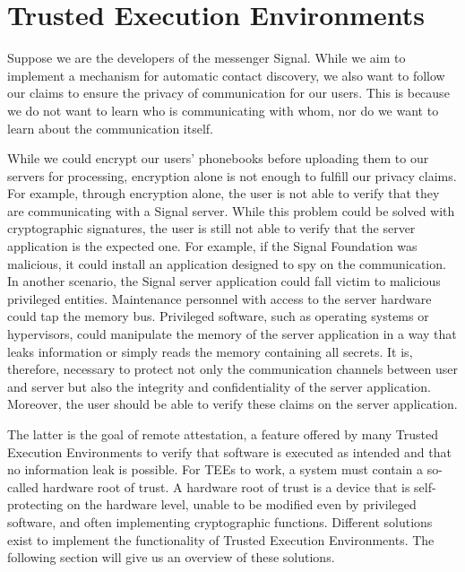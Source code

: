 \section{Trusted Execution Environments}
\label{sec:state:tee}

Suppose we are the developers of the messenger Signal. While we aim to implement a mechanism for automatic contact
discovery, we also want to follow our claims to ensure the privacy of communication for our users. This is because we do not
want to learn who is communicating with whom, nor do we want to learn about the communication itself.

While we could encrypt our users' phonebooks before uploading them to our servers for processing, encryption
alone is not enough to fulfill our privacy claims. For example, through encryption alone, the user is not able to
verify that they are communicating with a Signal server. While this problem could be solved with cryptographic
signatures, the user is still not able to verify that the server application is the expected one. For example, if
the Signal Foundation was malicious, it could install an application designed to spy on the communication. In another
scenario, the Signal server application could fall victim to malicious privileged entities.
Maintenance personnel with access to the server hardware could tap the memory bus. Privileged software, such as operating
systems or hypervisors, could manipulate the memory of the server application in a way that leaks information or
simply reads the memory containing all secrets. It is, therefore, necessary to protect not only the communication channels
between user and server but also the integrity and confidentiality of the server application. Moreover, the user should
be able to verify these claims on the server application.

The latter is the goal of remote attestation, a feature offered by many Trusted Execution Environments to verify that
software is executed as intended and that no information leak is possible. For TEEs to work, a system must contain a
so-called hardware root of trust. A hardware root of trust is a device that is self-protecting on the hardware level,
unable to be
modified even by privileged software, and often implementing cryptographic functions. Different solutions exist to
implement the functionality of Trusted Execution Environments. The following section will give us an overview of these
solutions.

